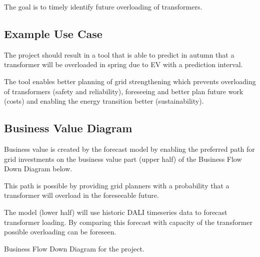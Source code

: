 \documentclass[letterpaper,10pt,english]{sphinxmanual}
\let\sphinxpxdimen\pdfpxdimen\else\newdimen\sphinxpxdimen
\begin{document}
The goal is to timely identify future overloading of transformers.


\subsection{Example Use Case}
\label{\detokenize{business_understanding:example-use-case}}
The project should result in a tool that is able to predict in autumn that a transformer will be overloaded in spring due to EV with a prediction interval.

The tool enables better planning of grid strengthening which prevents overloading of transformers (safety and reliability), foreseeing and better plan future work (costs) and enabling the energy transition better (sustainability).


\subsection{Business Value Diagram}
\label{\detokenize{business_understanding:business-value-diagram}}
Business value is created by the forecast model by enabling the preferred path for grid investments on the business value part (upper half) of the Business Flow Down Diagram below.

This path is possible by providing grid planners with a probability that a transformer will overload in the foreseeable future.

The model (lower half) will use historic DALI timeseries data to forecast transformer loading.
By comparing this forecast with capacity of the transformer possible overloading can be foreseen.

\noindent{\hspace*{\fill}\sphinxincludegraphics[width=800\sphinxpxdimen]{{value_flow_down}.png}\hspace*{\fill}}

Business Flow Down Diagram for the project.
\end{document}
